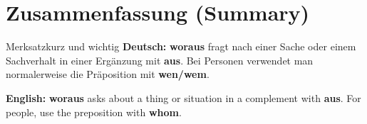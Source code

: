 \documentclass[a4paper,11pt]{article}
\newcommand{\GermanText}[1]{\textbf{Deutsch: }#1\par}
\newcommand{\EnglishText}[1]{{\small\color{SoftGray}\textbf{English: }#1\par}}
\begin{document}
\section{Zusammenfassung (Summary)}
\begin{grammarentry}{Merksatz}{kurz und wichtig}
\GermanText{\textbf{woraus} fragt nach einer Sache oder einem Sachverhalt in einer Ergänzung mit \textbf{aus}. Bei Personen verwendet man normalerweise die Präposition mit \textbf{wen/wem}.}
\EnglishText{\textbf{woraus} asks about a thing or situation in a complement with \textbf{aus}. For people, use the preposition with \textbf{whom}.}
\end{grammarentry}
\end{document}
